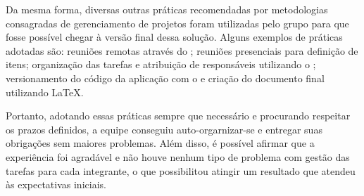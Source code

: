 Da mesma forma, diversas outras práticas recomendadas por metodologias consagradas de gerenciamento de projetos foram utilizadas pelo grupo para que fosse possível chegar à versão final dessa solução. Alguns exemplos de práticas adotadas são: reuniões remotas através do \software{} \hangouts{}; reuniões presenciais para definição de itens; organização das tarefas e atribuição de responsáveis utilizando o \software{} \trello{}; versionamento do código da aplicação com o \git{} e criação do documento final utilizando \LaTeX{}.

Portanto, adotando essas práticas sempre que necessário e procurando respeitar os prazos definidos, a equipe conseguiu auto-orgarnizar-se e entregar suas obrigações sem maiores problemas. Além disso, é possível afirmar que a experiência foi agradável e não houve nenhum tipo de problema com gestão das tarefas para cada integrante, o que possibilitou atingir um resultado que atendeu às expectativas iniciais.